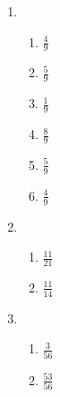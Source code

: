 {\begin{multicols}{3}
\begin{enumerate}[noitemsep, label=\textbf{\arabic*}. ]
      \item %
	    \begin{enumerate}[itemsep=1pt, label=\textbf{(\alph*)} ]
		\item $\frac{4}{9}$%
		\item $\frac{5}{9}$%
		\item $\frac{1}{9}$%
		\item $\frac{8}{9}$%
		\item $\frac{5}{9}$%
		\item $\frac{4}{9}$%
	    \end{enumerate}

      \item %
	    \begin{enumerate}[itemsep=1pt, label=\textbf{(\alph*)} ]
		\item $\frac{11}{21}$%
		\item $\frac{11}{14}$%
	    \end{enumerate}

      \item %
	    \begin{enumerate}[itemsep=1pt, label=\textbf{(\alph*)} ]
		\item$\frac{3}{56}$%
		\item $\frac{53}{56}$%
	    \end{enumerate}


\end{enumerate}
\end{multicols}}

